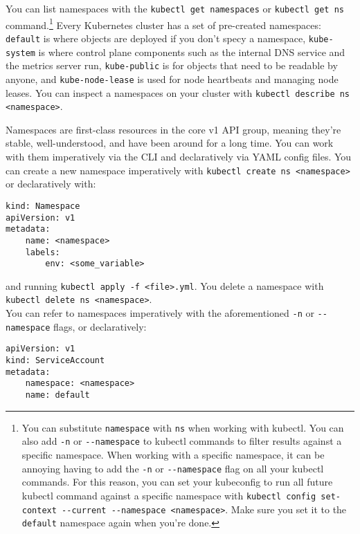 \documentclass[8pt, table, xcdraw]{article}%
\begin{document}
You can list namespaces with the \lstinline{kubectl get namespaces} or \lstinline{kubectl get ns} command.\footnote{You can substitute \lstinline{namespace} with \lstinline{ns} when working with kubectl. You can also add \lstinline{-n} or \lstinline{--namespace} to kubectl commands to filter results against a specific namespace. When working with a specific namespace, it can be annoying having to add the \lstinline{-n} or \lstinline{--namespace} flag on all your kubectl commands. For this reason, you can set your kubeconfig to run all future kubectl command against a specific namespace with \lstinline{kubectl config set-context --current --namespace <namespace>}. Make sure you set it to the \lstinline{default} namespace again when you're done.} Every Kubernetes cluster has a set of pre-created namespaces: \lstinline{default} is where objects are deployed if you don't specy a namespace, \lstinline{kube-system} is where control plane components such as the internal DNS service and the metrics server run, \lstinline{kube-public} is for objects that need to be readable by anyone, and \lstinline{kube-node-lease} is used for node heartbeats and managing node leases. You can inspect a namespaces on your cluster with \lstinline{kubectl describe ns <namespace>}.

Namespaces are first-class resources in the core v1 API group, meaning they’re stable, well-understood, and have been around for a long time. You can work with them imperatively via the CLI and declaratively via YAML config files. You can create a new namespace imperatively with \lstinline{kubectl create ns <namespace>} or declaratively with:

\begin{lstlisting}
kind: Namespace
apiVersion: v1
metadata:
    name: <namespace>
    labels:
        env: <some_variable>
\end{lstlisting}

and running \lstinline{kubectl apply -f <file>.yml}. You delete a namespace with \lstinline{kubectl delete ns <namespace>}.\\
You can refer to namespaces imperatively with the aforementioned \lstinline{-n} or \lstinline{--namespace} flags, or declaratively:

\begin{lstlisting}
apiVersion: v1
kind: ServiceAccount
metadata:
    namespace: <namespace>
    name: default
\end{lstlisting}
\end{document}
